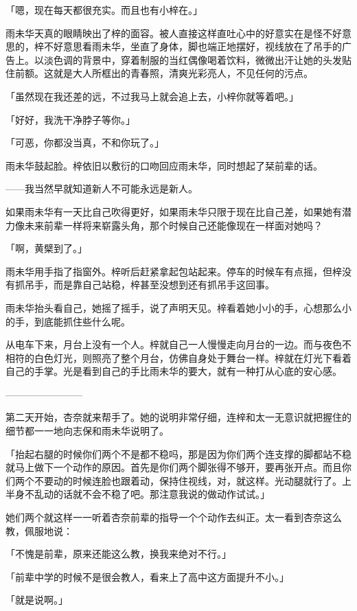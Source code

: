 \documentclass[UTF8]{ctexart}
\begin{document}
    「嗯，现在每天都很充实。而且也有小梓在。」

    雨未华天真的眼睛映出了梓的面容。被人直接这样直吐心中的好意实在是怪不好意思的，梓不好意思看雨未华，坐直了身体，脚也端正地摆好，视线放在了吊手的广告上。以淡色调的背景中，穿着制服的当红偶像喝着饮料，微微出汗让她的头发贴住前额。这就是大人所框出的青春照，清爽光彩亮人，不见任何的污点。

    「虽然现在我还差的远，不过我马上就会追上去，小梓你就等着吧。」

    「好好，我洗干净脖子等你。」

    「可恶，你都没当真，不和你玩了。」

    雨未华鼓起脸。梓依旧以敷衍的口吻回应雨未华，同时想起了栞前辈的话。

    ——我当然早就知道新人不可能永远是新人。

    如果雨未华有一天比自己吹得更好，如果雨未华只限于现在比自己差，如果她有潜力像未来前辈一样将来崭露头角，那个时候自己还能像现在一样面对她吗？

    「啊，黄檗到了。」

    雨未华用手指了指窗外。梓听后赶紧拿起包站起来。停车的时候车有点摇，但梓没有抓吊手，而是靠自己站稳，梓甚至没想到还有抓吊手这回事。

    雨未华抬头看自己，她摇了摇手，说了声明天见。梓看着她小小的手，心想那么小的手，到底能抓住些什么呢。

    从电车下来，月台上没有一个人。梓就自己一人慢慢走向月台的一边。而与夜色不相符的白色灯光，则照亮了整个月台，仿佛自身处于舞台一样。梓就在灯光下看着自己的手掌。光是看到自己的手比雨未华的要大，就有一种打从心底的安心感。

    ————————

    第二天开始，杏奈就来帮手了。她的说明非常仔细，连梓和太一无意识就把握住的细节都一一地向志保和雨未华说明了。

    「抬起右腿的时候你们两个不是都不稳吗，那是因为你们两个连支撑的脚都站不稳就马上做下一个动作的原因。首先是你们两个脚张得不够开，要再张开点。而且你们两个不要动的时候连脸也跟着动，保持住视线，对，就这样。光动腿就行了。上半身不乱动的话就不会不稳了吧。那注意我说的做动作试试。」

    她们两个就这样一一听着杏奈前辈的指导一个个动作去纠正。太一看到杏奈这么教，佩服地说：

    「不愧是前辈，原来还能这么教，换我来绝对不行。」

    「前辈中学的时候不是很会教人，看来上了高中这方面提升不小。」

    「就是说啊。」
\end{document}

